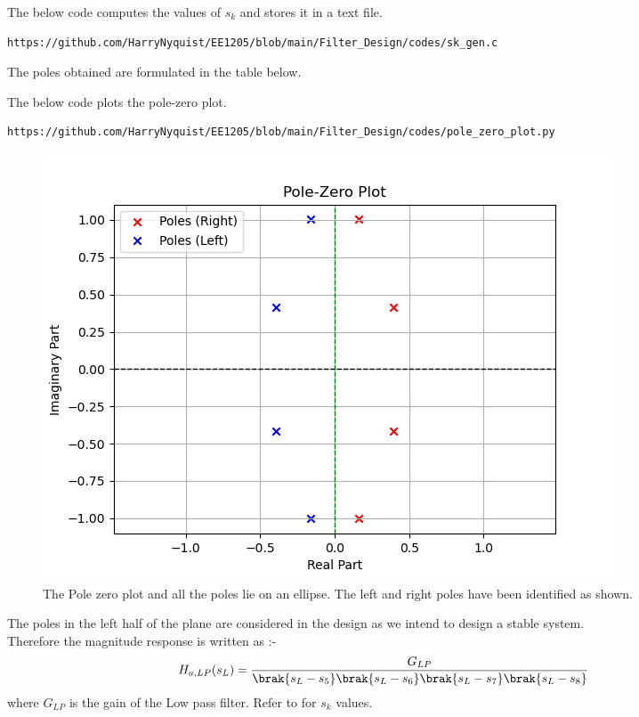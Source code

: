 \documentclass{article}
\begin{document}
\begin{enumerate}
The below code computes the values of $s_k$ and stores it in a text file. 
\begin{lstlisting}
https://github.com/HarryNyquist/EE1205/blob/main/Filter_Design/codes/sk_gen.c
\end{lstlisting}
The poles obtained are formulated in the table below.

The below code plots the pole-zero plot.
\begin{lstlisting}
https://github.com/HarryNyquist/EE1205/blob/main/Filter_Design/codes/pole_zero_plot.py
\end{lstlisting}
\begin{figure}[H]
\centering
\includegraphics[width=1\columnwidth]{figs/Pole_Zero_plt.png}
\caption{The Pole zero plot and all the poles lie on an ellipse. The left and right poles have been identified as shown.}
\label{fig:pole_zero_plt}
\end{figure}
The poles in the left half of the plane are considered in the design as we intend to design a stable system.\\
Therefore the magnitude response is written as :- 
\begin{align}
    H_{a,LP}(s_L) &= \frac{G_{LP}}{\brak{s_L-s_5}\brak{s_L-s_6}\brak{s_L-s_7}\brak{s_L-s_8}}
\end{align}
where $G_{LP}$ is the gain of the Low pass filter. Refer to  for $s_k$ values.\\


\end{enumerate}
\end{document}
